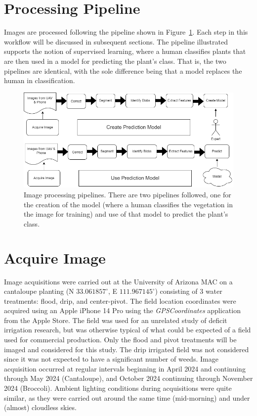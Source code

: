 \documentclass[letterpaper]{report}
\begin{document}
\section{Processing Pipeline}
Images are processed following the pipeline shown in Figure~\ref{fig:workflow}. Each step in this workflow will be discussed in subsequent sections. The pipeline illustrated supports the notion of supervised learning, where a human classifies plants that are then used in a model for predicting the plant's class. That is, the two pipelines are identical, with the sole difference being that a model replaces the human in classification. 
\begin{figure}[H]
	\centering
	\includegraphics[width=0.85\linewidth]{./figures/workflow.png}
	\caption[Image processing workflow]{Image processing pipelines. There are two pipelines followed, one for the creation of the model (where a human classifies the vegetation in the image for training) and use of that model to predict the plant's class.}
	\label{fig:workflow}	
\end{figure}


\section{Acquire Image}
Image acquisitions were carried out at the University of Arizona \gls{MAC} on a cantaloupe planting (N $33.061857^\circ$, E $111.967145^\circ$) consisting of 3 water treatments: flood, drip, and center-pivot. The field location coordinates were acquired using an Apple iPhone 14 Pro using the \textit{GPSCoordinates} application from the Apple Store. The field was used for an unrelated study of deficit irrigation research, but was otherwise typical of what could be expected of a field used for commercial production.
Only the flood and pivot treatments will be imaged and considered for this study. The drip irrigated field was not considered since it was not expected to have a significant number of weeds.  Image acquisition occurred at regular intervals beginning in April 2024 and continuing through May 2024 (Cantaloupe), and October 2024 continuing through November 2024 (Broccoli).  Ambient lighting conditions during acquisitions were quite similar, as they were carried out around the same time (mid-morning) and under (almost) cloudless skies.
\end{document}
